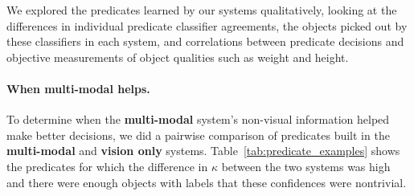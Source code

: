 We explored the predicates learned by our systems qualitatively, looking at the differences in individual predicate classifier agreements, the objects picked out by these classifiers in each system, and correlations between predicate decisions and objective measurements of object qualities such as weight and height.

\paragraph{When multi-modal helps.}
To determine when the \textbf{multi-modal} system's non-visual information helped make better decisions, we did a pairwise comparison of predicates built in the \textbf{multi-modal} and \textbf{vision only} systems.
Table~\ref{tab:predicate_examples} shows the predicates for which the difference in $\kappa$ between the two systems was high and there were enough objects with labels that these confidences were nontrivial.

